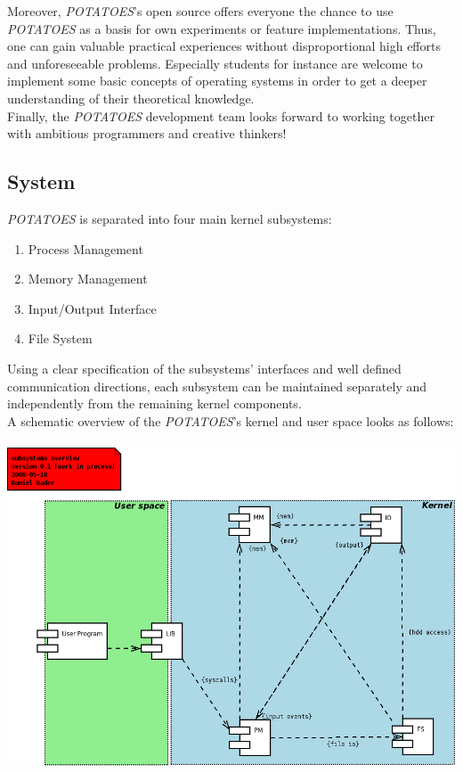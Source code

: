 \documentclass[11pt,a4paper]{scrartcl}
\begin{document}
Moreover, \textit{POTATOES}'s open source offers everyone the chance to use \textit{POTATOES} as a basis for own experiments or feature implementations. Thus, one can gain valuable practical experiences without disproportional high efforts and unforeseeable problems. Especially students for instance are welcome to implement some basic concepts of operating systems in order to get a deeper understanding of their theoretical knowledge.\\

Finally, the \textit{POTATOES} development team looks forward to working together with ambitious programmers and creative thinkers!

\pagebreak

\subsection{System}
\textit{POTATOES} is separated into four main kernel subsystems: 
\begin{enumerate}
	\item Process Management
	\item Memory Management
	\item Input/Output Interface
	\item File System
\end{enumerate}

Using a clear specification of the subsystems' interfaces and well defined communication directions, each subsystem can be maintained separately and independently from the remaining kernel components.\\

A schematic overview of the \textit{POTATOES}'s kernel and user space looks as follows:\\\\

\includegraphics[width=\textwidth]{subsystems.png}
\pagebreak
\end{document}
